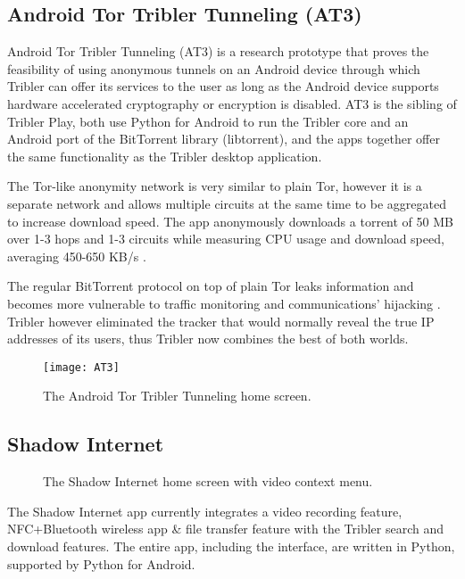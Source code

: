\documentclass[conference,compsoc]{IEEEtran}
\begin{document}
\subsection{Android Tor Tribler Tunneling (AT3)}

Android Tor Tribler Tunneling (AT3) is a research prototype that proves the feasibility of using anonymous tunnels on an Android device through which Tribler can offer its services to the user as long as the Android device supports hardware accelerated cryptography or encryption is disabled.
AT3 is the sibling of Tribler Play, both use Python for Android to run the Tribler core and an Android port of the BitTorrent library (libtorrent), and the apps together offer the same functionality as the Tribler desktop application. \cite{triber2014at3}

The Tor-like anonymity network is very similar to plain Tor, however it is a separate network and allows multiple circuits at the same time to be aggregated to increase download speed.
The app anonymously downloads a torrent of 50 MB over 1-3 hops and 1-3 circuits while measuring CPU usage and download speed, averaging 450-650 KB/s \cite{triber2014at3}.

The regular BitTorrent protocol on top of plain Tor leaks information and becomes more vulnerable to traffic monitoring and communications' hijacking \cite{DBLP:journals/corr/abs-1004-1461}.
Tribler however eliminated the tracker that would normally reveal the true IP addresses of its users, thus Tribler now combines the best of both worlds.

\begin{figure}[h!]
\centering
\texttt{[image: AT3]}
\caption{The Android Tor Tribler Tunneling home screen.}
\label{fig_at3}
\end{figure}


\subsection{Shadow Internet}

\begin{figure}[b!]
\centering
{
\setlength{\fboxsep}{0pt}
\setlength{\fboxrule}{1pt}
}
\caption{The Shadow Internet home screen with video context menu.}
\label{fig_shadowinternet}
\end{figure}

The Shadow Internet app currently integrates a video recording feature, NFC+Bluetooth wireless app \& file transfer feature with the Tribler search and download features.
The entire app, including the interface, are written in Python, supported by Python for Android. \cite{tribler2015shadowinternet}
\end{document}
